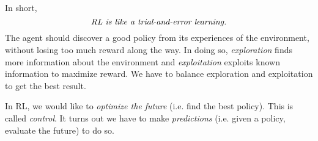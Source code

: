\documentclass[RL]{subfile}
\begin{document}
    \np In short,
    \begin{equation}
        \text{\textit{RL is like a trial-and-error learning.}}
    \end{equation}
    The agent should discover a good policy from its experiences of the environment, without losing too much reward along the way. In doing so, \textit{exploration} finds more information about the environment and \textit{exploitation} exploits known information to maximize reward. We have to balance exploration and exploitation to get the best result.

    \np In RL, we would like to \textit{optimize the future} (i.e. find the best policy). This is called \textit{control}. It turns out we have to make \textit{predictions} (i.e. given a policy, evaluate the future) to do so.
\end{document}
